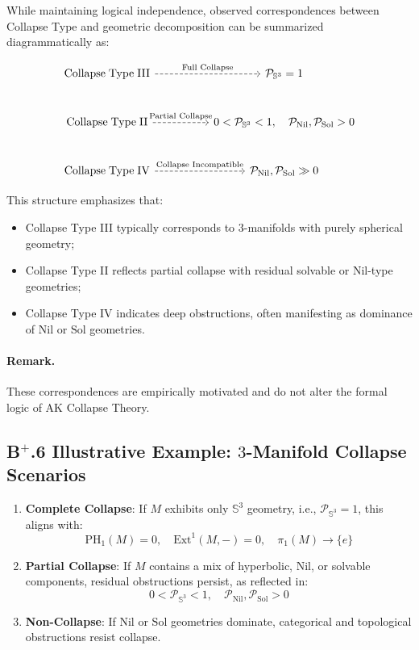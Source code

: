 \documentclass[11pt]{article}
\begin{document}
While maintaining logical independence, observed correspondences between Collapse Type and geometric decomposition can be summarized diagrammatically as:

\[
\begin{tikzcd}[column sep=huge, row sep=large]
\mathrm{Collapse\;Type\;III} \arrow[r, dashed, "\text{Full Collapse}"]
& \mathcal{P}_{\mathbb{S}^3} = 1 \\
\mathrm{Collapse\;Type\;II} \arrow[r, dashed, "\text{Partial Collapse}"]
& 0 < \mathcal{P}_{\mathbb{S}^3} < 1,\quad \mathcal{P}_{\mathrm{Nil}},\mathcal{P}_{\mathrm{Sol}} > 0 \\
\mathrm{Collapse\;Type\;IV} \arrow[r, dashed, "\text{Collapse Incompatible}"]
& \mathcal{P}_{\mathrm{Nil}},\mathcal{P}_{\mathrm{Sol}} \gg 0
\end{tikzcd}
\]

This structure emphasizes that:

\begin{itemize}
    \item Collapse Type III typically corresponds to $3$-manifolds with purely spherical geometry;
    \item Collapse Type II reflects partial collapse with residual solvable or Nil-type geometries;
    \item Collapse Type IV indicates deep obstructions, often manifesting as dominance of $\mathrm{Nil}$ or $\mathrm{Sol}$ geometries.
\end{itemize}

\paragraph{Remark.} These correspondences are empirically motivated and do not alter the formal logic of AK Collapse Theory.

\subsection*{B$^{+}$.6 Illustrative Example: $3$-Manifold Collapse Scenarios}

\begin{enumerate}
    \item \textbf{Complete Collapse}: If $M$ exhibits only $\mathbb{S}^3$ geometry, i.e., $\mathcal{P}_{\mathbb{S}^3} = 1$, this aligns with:
    \[
    \mathrm{PH}_1(M) = 0,\quad \mathrm{Ext}^1(M, -) = 0,\quad \pi_1(M) \longrightarrow \{e\}
    \]
    \item \textbf{Partial Collapse}: If $M$ contains a mix of hyperbolic, Nil, or solvable components, residual obstructions persist, as reflected in:
    \[
    0 < \mathcal{P}_{\mathbb{S}^3} < 1,\quad \mathcal{P}_{\mathrm{Nil}},\mathcal{P}_{\mathrm{Sol}} > 0
    \]
    \item \textbf{Non-Collapse}: If $\mathrm{Nil}$ or $\mathrm{Sol}$ geometries dominate, categorical and topological obstructions resist collapse.
\end{enumerate}
\end{document}
